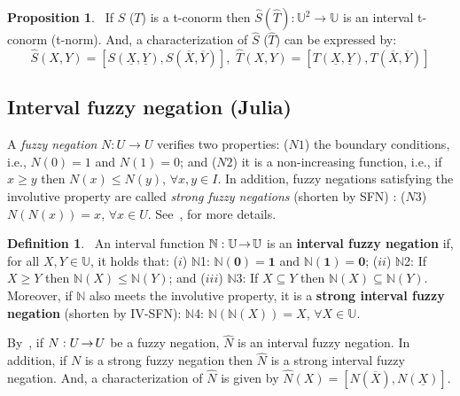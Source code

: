 \documentclass[12pt]{article}
\theoremstyle{plain}
\theoremstyle{remark}
\newtheorem{remark}[theorem]{Remark}
\theoremstyle{definition}
\newtheorem{definition}[theorem]{Definition}
\theoremstyle{proposition}
\newtheorem{proposition}[theorem]{Proposition}
\newcommand{\lra}{\hspace{-0.05cm}\rightarrow\hspace{-0.05cm}}
\newcommand{\UU}{\mathbb{U} }
\begin{document}
\begin{proposition}~\cite[Theorem 5.1]{BT06b}\label{pro-it-norm}
If  $S$ ($T$) is a t-conorm  then $\widehat{S} (\widehat{T}):\UU^2 \rightarrow \UU$ is an interval t-conorm (t-norm).
And, a characterization of $\widehat{S}$ ($\widehat{T}$) can be expressed by:
\begin{equation}\label{eq-int-s}
\widehat{S}(X,Y)=[S(\underline{X},\underline{Y}),
S(\overline{X},\overline{Y})],
\,\, \widehat{T}(X,Y)=[T(\underline{X},\underline{Y}),
T(\overline{X},\overline{Y})]
\end{equation}
\end{proposition}


\subsection{Interval fuzzy negation (Julia)}\label{subsec-4c} 

A \emph{fuzzy negation} $N:U \rightarrow U$  verifies two properties: ($N1$) the boundary conditions, i.e.,
 $N(0) = 1$ and  $N(1) = 0$; and ($N2$) it is a non-increasing function, i.e.,
if $x \geq y$ then $N(x)\leq N(y)$, $\forall x,y \in I$. In addition, fuzzy negations satisfying the involutive property are called \emph{strong fuzzy negations} (shorten by SFN)
: ($N3$) $N(N(x))=x$, $\forall x \in U$. See~\cite{BBS03}, for more details.
%


\begin{definition}~\cite[Def.~4.1]{BT06b}\label{theo-neg}
An interval function  $\mathbb{N}:\mathbb{U} \lra  \mathbb{U}$ is an \textbf{interval fuzzy negation} if, for all $X,Y \in\mathbb{U}$, it holds that: ($i$) $\mathbb{N}$1: $\mathbb{N}(\mathbf{0}) = \mathbf{1}$ and $\mathbb{N}(\mathbf{1}) = \mathbf{0}$; ($ii$) $\mathbb{N}$2: If $X \geq Y$ then $\mathbb{N}(X)\leq \mathbb{N}(Y)$; and ($iii$) $\mathbb{N}$3: If $X\subseteq Y$ then $\mathbb{N}(X)\subseteq \mathbb{N}(Y)$.
Moreover, if $\mathbb{N}$ also meets the involutive property, it
is a \textbf{strong interval fuzzy negation} (shorten by IV-SFN):
$\mathbb{N}$4: $\mathbb{N}(\mathbb{N}(X)) = X$, $\forall X
\in \mathbb{U}$.
\end{definition}
By~\cite[Theorem4.1.1]{BT06b}, if $N: U \lra U$  be a fuzzy negation, $\widehat{N}$  is an
interval fuzzy negation. In addition, if $N$ is a strong fuzzy
negation then $\widehat{N}$ is a strong interval fuzzy negation. And, a characterization of $\widehat{N}$ is given by $\widehat{N}(X)=[N(\overline{X}),N(\underline{X})]$.\vspace{-0.3cm}
\end{document}
